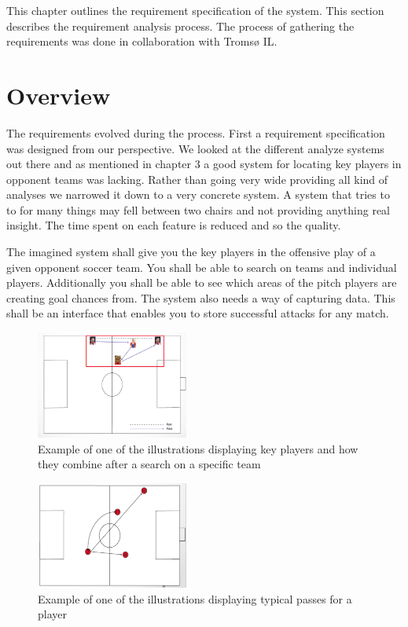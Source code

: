 This chapter outlines the requirement specification of the system. This section describes the requirement analysis process. The process of gathering the requirements was done in collaboration with Tromsø IL.

\section{Overview}

The requirements evolved during the process. First a requirement specification was designed from our perspective. We looked at the different analyze systems out there and as mentioned in chapter 3 a good system for locating key players in opponent teams was lacking. Rather than going very wide providing all kind of analyses we narrowed it down to a very concrete system. A system that tries to to for many things may fell between two chairs and not providing anything real insight. The time spent on each feature is reduced and so the quality. 

The imagined system shall give you the key players in the offensive play of a given opponent soccer team. You shall be able to search on teams and individual players. Additionally you shall be able to see which areas of the pitch players are creating goal chances from. The system also needs a way of capturing data. This shall be an interface that enables you to store successful attacks for any match.


\begin{figure}[ht!]
\centering
\includegraphics[width=50mm]{images/general/illustration_after_search.png}
\caption{Example of one of the illustrations displaying key players and how they combine after a search on a specific team}
\label{overflow}
\end{figure}

\begin{figure}[ht!]
\centering
\includegraphics[width=50mm]{images/general/illustration_after_search2.png}
\caption{Example of one of the illustrations displaying typical passes for a player}
\label{overflow}
\end{figure}


